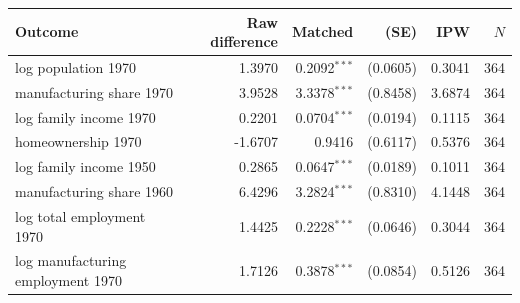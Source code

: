 \begin{tabular}{lrrrrr}
\toprule
Outcome & Raw difference & Matched & (SE) & IPW & $N$ \\
\midrule
log population 1970 & 1.3970 & 0.2092$^{***}$ & (0.0605) & 0.3041 & 364 \\
manufacturing share 1970 & 3.9528 & 3.3378$^{***}$ & (0.8458) & 3.6874 & 364 \\
log family income 1970 & 0.2201 & 0.0704$^{***}$ & (0.0194) & 0.1115 & 364 \\
homeownership 1970 & -1.6707 & 0.9416 & (0.6117) & 0.5376 & 364 \\
log family income 1950 & 0.2865 & 0.0647$^{***}$ & (0.0189) & 0.1011 & 364 \\
manufacturing share 1960 & 6.4296 & 3.2824$^{***}$ & (0.8310) & 4.1448 & 364 \\
log total employment 1970 & 1.4425 & 0.2228$^{***}$ & (0.0646) & 0.3044 & 364 \\
log manufacturing employment 1970 & 1.7126 & 0.3878$^{***}$ & (0.0854) & 0.5126 & 364 \\
\bottomrule
\end{tabular}